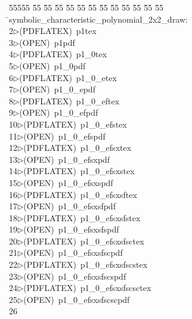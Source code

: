 %
%
\begin{tabbing}
55555 \= 55 \= 55 \= 55 \= 55 \= 55 \= 55 \= 55 \= 55 \= 55 \= 55 \= 55 \= 55 \= \>symbolic\_characteristic\_polynomial\_2x2\_draw:\\[0pt]
2\>$\triangleright$\>(PDFLATEX)\ p1tex\\[0pt]
3\>$\triangleright$\>(OPEN)\ p1pdf\\[0pt]
4\>$\triangleright$\>(PDFLATEX)\ p1\_0tex\\[0pt]
5\>$\triangleright$\>(OPEN)\ p1\_0pdf\\[0pt]
6\>$\triangleright$\>(PDFLATEX)\ p1\_0\_etex\\[0pt]
7\>$\triangleright$\>(OPEN)\ p1\_0\_epdf\\[0pt]
8\>$\triangleright$\>(PDFLATEX)\ p1\_0\_eftex\\[0pt]
9\>$\triangleright$\>(OPEN)\ p1\_0\_efpdf\\[0pt]
10\>$\triangleright$\>(PDFLATEX)\ p1\_0\_efstex\\[0pt]
11\>$\triangleright$\>(OPEN)\ p1\_0\_efspdf\\[0pt]
12\>$\triangleright$\>(PDFLATEX)\ p1\_0\_efsxtex\\[0pt]
13\>$\triangleright$\>(OPEN)\ p1\_0\_efsxpdf\\[0pt]
14\>$\triangleright$\>(PDFLATEX)\ p1\_0\_efsxstex\\[0pt]
15\>$\triangleright$\>(OPEN)\ p1\_0\_efsxspdf\\[0pt]
16\>$\triangleright$\>(PDFLATEX)\ p1\_0\_efsxsftex\\[0pt]
17\>$\triangleright$\>(OPEN)\ p1\_0\_efsxsfpdf\\[0pt]
18\>$\triangleright$\>(PDFLATEX)\ p1\_0\_efsxsfstex\\[0pt]
19\>$\triangleright$\>(OPEN)\ p1\_0\_efsxsfspdf\\[0pt]
20\>$\triangleright$\>(PDFLATEX)\ p1\_0\_efsxsfsctex\\[0pt]
21\>$\triangleright$\>(OPEN)\ p1\_0\_efsxsfscpdf\\[0pt]
22\>$\triangleright$\>(PDFLATEX)\ p1\_0\_efsxsfscstex\\[0pt]
23\>$\triangleright$\>(OPEN)\ p1\_0\_efsxsfscspdf\\[0pt]
24\>$\triangleright$\>(PDFLATEX)\ p1\_0\_efsxsfscsctex\\[0pt]
25\>$\triangleright$\>(OPEN)\ p1\_0\_efsxsfscscpdf\\[0pt]
26\>\end{tabbing}
